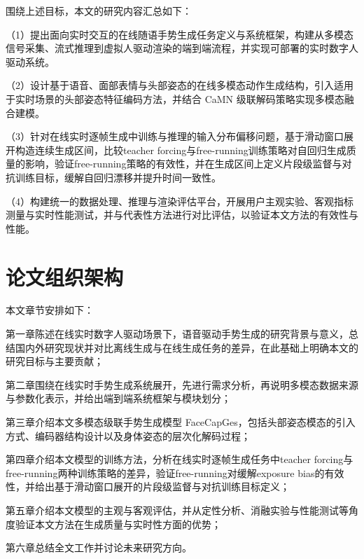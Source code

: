 围绕上述目标，本文的研究内容汇总如下：

（1）提出面向实时交互的在线随语手势生成任务定义与系统框架，构建从多模态信号采集、流式推理到虚拟人驱动渲染的端到端流程，并实现可部署的实时数字人驱动系统。

（2）设计基于语音、面部表情与头部姿态的在线多模态动作生成结构，引入适用于实时场景的头部姿态特征编码方法，并结合 CaMN 级联解码策略实现多模态融合建模。

（3）针对在线实时逐帧生成中训练与推理的输入分布偏移问题，基于滑动窗口展开构造连续生成区间，比较teacher forcing与free-running训练策略对自回归生成质量的影响，验证free-running策略的有效性，并在生成区间上定义片段级监督与对抗训练目标，缓解自回归漂移并提升时间一致性。

（4）构建统一的数据处理、推理与渲染评估平台，开展用户主观实验、客观指标测量与实时性能测试，并与代表性方法进行对比评估，以验证本文方法的有效性与性能。

\section{论文组织架构}
本文章节安排如下：

第一章陈述在线实时数字人驱动场景下，语音驱动手势生成的研究背景与意义，总结国内外研究现状并对比离线生成与在线生成任务的差异，在此基础上明确本文的研究目标与主要贡献；

第二章围绕在线实时手势生成系统展开，先进行需求分析，再说明多模态数据来源与参数化表示，并给出端到端系统框架与模块划分；

第三章介绍本文多模态级联手势生成模型 FaceCapGes，包括头部姿态模态的引入方式、编码器结构设计以及身体姿态的层次化解码过程；

第四章介绍本文模型的训练方法，分析在线实时逐帧生成任务中teacher forcing与free-running两种训练策略的差异，验证free-running对缓解exposure bias的有效性，并给出基于滑动窗口展开的片段级监督与对抗训练目标定义；

第五章介绍本文模型的主观与客观评估，并从定性分析、消融实验与性能测试等角度验证本文方法在生成质量与实时性方面的优势；

第六章总结全文工作并讨论未来研究方向。